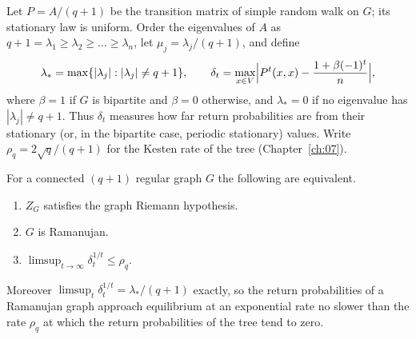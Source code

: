 Let $P=A/(q+1)$ be the transition matrix of simple random walk on $G$; its stationary law is uniform. Order the eigenvalues of $A$ as $q+1=\lambda_1\ge\lambda_2\ge\dots\ge\lambda_n$, let $\mu_j=\lambda_j/(q+1)$, and define
\[
\lambda_*=\max\{|\lambda_j|:|\lambda_j|\ne q+1\},\qquad \delta_t=\max_{x\in V}\Bigl|P^t(x,x)-\frac{1+\beta(-1)^t}{n}\Bigr|,
\]
where $\beta=1$ if $G$ is bipartite and $\beta=0$ otherwise, and $\lambda_*=0$ if no eigenvalue has $|\lambda_j|\ne q+1$. Thus $\delta_t$ measures how far return probabilities are from their stationary (or, in the bipartite case, periodic stationary) values. Write $\rho_q=2\sqrt q/(q+1)$ for the Kesten rate of the tree (Chapter~\ref{ch:07}).

\begin{proposition}\label{prop:08three}
For a connected $(q+1)$ regular graph $G$ the following are equivalent.
\begin{enumerate}
\item $Z_G$ satisfies the graph Riemann hypothesis.
\item $G$ is Ramanujan.
\item $\limsup_{t\to\infty}\delta_t^{1/t}\le\rho_q$.
\end{enumerate}
Moreover $\limsup_t\delta_t^{1/t}=\lambda_*/(q+1)$ exactly, so the return probabilities of a Ramanujan graph approach equilibrium at an exponential rate no slower than the rate $\rho_q$ at which the return probabilities of the tree tend to zero.
\end{proposition}

